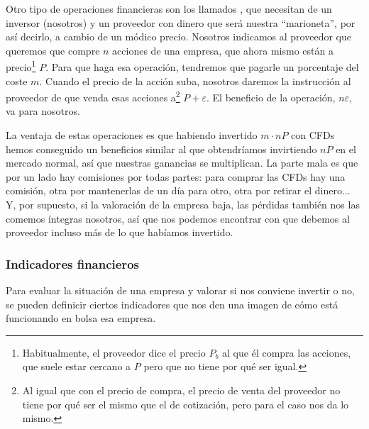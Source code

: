 \documentclass[nochap,palatino,shortheader]{apuntes}
\begin{document}
Otro tipo de operaciones financieras son los llamados , que necesitan de un inversor (nosotros) y un proveedor con dinero que será nuestra ``marioneta'', por así decirlo, a cambio de un módico precio. Nosotros indicamos al proveedor que queremos que compre $n$ acciones de una empresa, que ahora mismo están a precio\footnote{Habitualmente, el proveedor dice el precio $P_b$ al que él compra las acciones, que suele estar cercano a $P$ pero que no tiene por qué ser igual.} $P$. Para que haga esa operación, tendremos que pagarle un porcentaje del coste $m$. Cuando el precio de la acción suba, nosotros daremos la instrucción al proveedor de que venda esas acciones a\footnote{Al igual que con el precio de compra, el precio de venta del proveedor no tiene por qué ser el mismo que el de cotización, pero para el caso nos da lo mismo.} $P + ε$. El beneficio de la operación, $nε$, va para nosotros.

La ventaja de estas operaciones es que habiendo invertido $m·nP$ con CFDs hemos conseguido un beneficios similar al que obtendríamos invirtiendo $nP$ en el mercado normal, así que nuestras ganancias se multiplican. La parte mala es que por un lado hay comisiones por todas partes: para comprar las CFDs hay una comisión, otra por mantenerlas de un día para otro, otra por retirar el dinero... Y, por supuesto, si la valoración de la empresa baja, las pérdidas también nos las comemos íntegras nosotros, así que nos podemos encontrar con que debemos al proveedor incluso más de lo que habíamos invertido.

\subsubsection{Indicadores financieros}
\label{sec:IndicadoresFinancieros}

Para evaluar la situación de una empresa y valorar si nos conviene invertir o no, se pueden definicir ciertos indicadores que nos den una imagen de cómo está funcionando en bolsa esa empresa.
\end{document}
